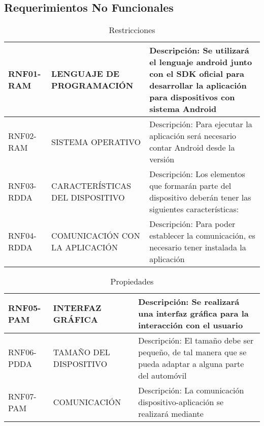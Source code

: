 \subsection{Requerimientos No Funcionales} 
  
  \begin{center}
\begin{table}[!htb]
\centering
\begin{tabular}{|p{4cm}|p{4cm}|p{5cm}|}
    \hline
    RNF01-RAM & LENGUAJE DE PROGRAMACIÓN & Descripción: Se utilizará el lenguaje android junto con el SDK oficial para desarrollar la aplicación para dispositivos con sistema Android \\ \hline
    RNF02-RAM & SISTEMA OPERATIVO & Descripción: Para ejecutar la aplicación será necesario contar Android desde la versión \\ \hline
    RNF03-RDDA & CARACTERÍSTICAS DEL DISPOSITIVO & Descripción: Los elementos que formarán parte del dispositivo deberán tener las siguientes características: \\ \hline
    RNF04-RDDA & COMUNICACIÓN CON LA APLICACIÓN & Descripción: Para poder establecer la comunicación, es necesario tener instalada la aplicación \\
    \hline
\end{tabular}
\caption{Restricciones}
\label{tabla:rf_res}
\end{table}
\end{center}



\begin{center}
\begin{table}[!htb]
\centering
\begin{tabular}{|p{4cm}|p{4cm}|p{5cm}|}
    \hline
    RNF05-PAM & INTERFAZ GRÁFICA & Descripción: Se realizará una interfaz gráfica para la interacción con el usuario \\ \hline 
    RNF06-PDDA & TAMAÑO DEL DISPOSITIVO & Descripción: El tamaño debe ser pequeño, de tal manera que se pueda adaptar a alguna parte del automóvil \\ \hline
    RNF07-PAM &  COMUNICACIÓN & Descripción: La comunicación dispositivo-aplicación se realizará mediante \\
    \hline
\end{tabular}
\caption{Propiedades}
\label{tabla:rf_prop}
\end{table}
\end{center}
